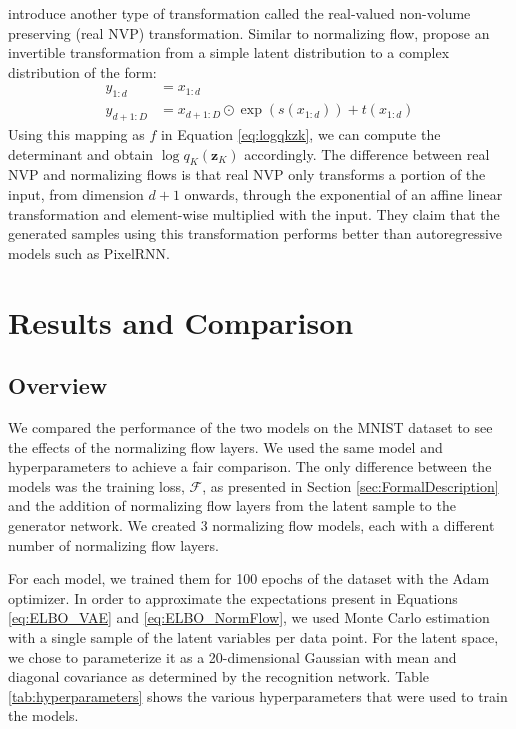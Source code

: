 \documentclass{article}
\newcommand{\bz}{\mathbf{z}}
\begin{document}
\citet{D16} introduce another type of transformation called the real-valued non-volume preserving (real NVP) 
transformation. Similar to normalizing flow, \citet{D16} propose an invertible transformation from a simple
latent distribution to a complex distribution of the form:
\begin{align}
	y_{1:d} &= x_{1:d} \\
	y_{d+1:D} &= x_{d+1:D} \odot \exp\left(s(x_{1:d})\right) + t\left(x_{1:d}\right)
\end{align}
Using this mapping as $f$ in Equation \ref{eq:logqkzk}, we can compute the determinant and 
obtain $\log q_K(\bz_K)$ accordingly. The difference between real NVP and normalizing flows is that 
real NVP only transforms a portion of the input, from dimension $d+1$ onwards, through the exponential 
of an affine linear transformation and element-wise multiplied with the input. They claim that the generated 
samples using this transformation performs better than autoregressive models such as PixelRNN.

\section{Results and Comparison}

\subsection{Overview}
We compared the performance of the two models on the MNIST dataset to see the effects of the normalizing
flow layers. We used the same model and hyperparameters to achieve a fair comparison. The only 
difference between the models was the training loss, $\mathcal{F}$, as presented in Section 
\ref{sec:FormalDescription} and the addition of normalizing flow layers from the latent sample to the 
generator network. We created 3 normalizing flow models, each with a different number of normalizing flow layers.

For each model, we trained them for 100 epochs of the dataset with the Adam optimizer. In order to approximate 
the expectations present in Equations \ref{eq:ELBO_VAE} and \ref{eq:ELBO_NormFlow}, we used Monte Carlo 
estimation with a single sample of the latent variables per data point. For the latent space, we chose to 
parameterize it as a 20-dimensional Gaussian with mean and diagonal covariance as determined by the 
recognition network. Table \ref{tab:hyperparameters} shows the various hyperparameters that were used to
train the models.
\end{document}
